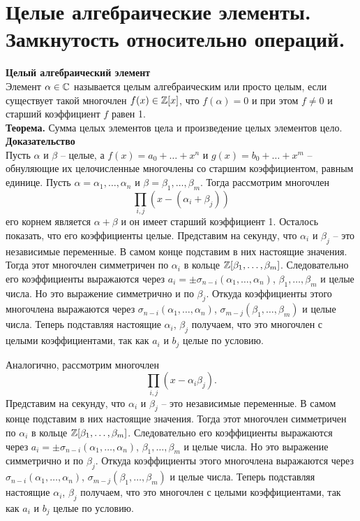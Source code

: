 \section{
 Целые алгебраические элементы. Замкнутость относительно операций.
}

{\bf Целый алгебраический элемент}\\
Элемент $\alpha \in \mathbb{C}$ называется целым алгебраическим или просто целым, если существует такой многочлен $f(x)\in \mathbb{Z}[x]$, что $f(\alpha)=0$ и при этом $f\neq 0$ и старший коэффициент $f$ равен 1.\\


{\bf Теорема.} Сумма целых элементов цела и произведение целых элементов цело. \\
{\bf Доказательство}\\
Пусть $\alpha$ и $\beta$ -- целые, а $f(x)=a_0+\dots+x^n$ и $g(x)=b_0+\dots+x^m$ -- обнуляющие их целочисленные многочлены со старшим коэффициентом, равным единице. Пусть $\alpha=\alpha_1,\dots,\alpha_n$ и $\beta=\beta_1,\dots,\beta_m$. Тогда рассмотрим многочлен
$$\prod_{i,j} (x -(\alpha_i+\beta_j))$$
его корнем является $\alpha+\beta$ и он имеет старший коэффициент 1. Осталось показать, что его коэффициенты целые. Представим на секунду, что $\alpha_i$ и $\beta_j$ -- это независимые переменные. В самом конце подставим в них настоящие значения. Тогда этот многочлен симметричен по $\alpha_i$ в кольце $\mathbb{Z}[\beta_1,\dots,\beta_m]$. Следовательно его коэффициенты выражаются через $a_i=\pm \sigma_{n-i}(\alpha_1,\dots,\alpha_n)$, $\beta_1,\dots,\beta_m$ и целые числа. Но это выражение симметрично и по $\beta_j$. Откуда коэффициенты этого многочлена выражаются через $\sigma_{n-i}(\alpha_1,\dots,\alpha_n)$,  $\sigma_{m-j}(\beta_1,\dots,\beta_m)$ и целые числа. Теперь подставляя настоящие $\alpha_i$, $\beta_j$ получаем, что это многочлен с целыми коэффициентами, так как $a_i$ и $b_j$ целые по условию.

Аналогично, рассмотрим многочлен 
$$\prod_{i,j} (x-\alpha_i\beta_j).$$
Представим на секунду, что $\alpha_i$ и $\beta_j$ -- это независимые переменные. В самом конце подставим в них настоящие значения. Тогда этот многочлен симметричен по $\alpha_i$ в кольце $\mathbb{Z}[\beta_1,\dots,\beta_m]$. Следовательно его коэффициенты выражаются через $a_i=\pm \sigma_{n-i}(\alpha_1,\dots,\alpha_n)$, $\beta_1,\dots,\beta_m$ и целые числа. Но это выражение симметрично и по $\beta_j$. Откуда коэффициенты этого многочлена выражаются через $\sigma_{n-i}(\alpha_1,\dots,\alpha_n)$,  $\sigma_{m-j}(\beta_1,\dots,\beta_m)$ и целые числа. Теперь подставляя настоящие $\alpha_i$, $\beta_j$ получаем, что это многочлен с целыми коэффициентами, так как $a_i$ и $b_j$ целые по условию.
